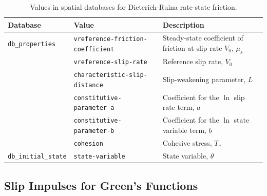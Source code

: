 \noindent \begin{center}
\begin{table}[H]
\noindent \centering{}\caption{\label{tab:rate:state:ageing:properties:statevars}Values in spatial
databases for Dieterich-Ruina rate-state friction.}
\medskip{}
\begin{tabular}{|l|l|>{\raggedright}p{2.5in}|}
\hline 
\textbf{Database} & \textbf{Value} & \textbf{Description}\tabularnewline
\hline 
\hline 
\texttt{db\_properties} & \texttt{vreference-friction-coefficient} & Steady-state coefficient of friction at slip rate $V_{0}$, $\mu_{s}$\tabularnewline
\cline{2-3} 
 & \texttt{vreference-slip-rate} & Reference slip rate, $V_{0}$\tabularnewline
\cline{2-3} 
 & \texttt{characteristic-slip-distance} & Slip-weakening parameter, $L$\tabularnewline
\cline{2-3} 
 & \texttt{constitutive-parameter-a} & Coefficient for the $\ln$ slip rate term, $a$\tabularnewline
\cline{2-3} 
 & \texttt{constitutive-parameter-b} & Coefficient for the $\ln$ state variable term, $b$\tabularnewline
\cline{2-3} 
 & \texttt{cohesion} & Cohesive stress, $T_{c}$\tabularnewline
\hline 
\texttt{db\_initial\_state} & \texttt{state-variable} & State variable, $\theta$\tabularnewline
\hline 
\end{tabular}
\end{table}

\par\end{center}


\subsection{\label{sec:fault:cohesive:impulses}Slip Impulses for Green's Functions}

